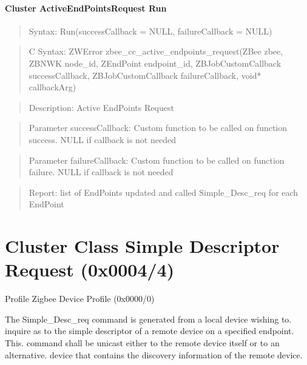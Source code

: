 \paragraph{Cluster ActiveEndPointsRequest Run}
\begin{quote}Syntax: Run(successCallback = NULL, failureCallback = NULL)\end{quote}
\begin{quote}C Syntax: ZWError zbee\_cc\_active\_endpoints\_request(ZBee zbee, ZBNWK node\_id, ZEndPoint endpoint\_id, ZBJobCustomCallback successCallback, ZBJobCustomCallback failureCallback, void* callbackArg)\end{quote}
\begin{quote}Description: Active EndPoints Request\end{quote}
\begin{quote}Parameter successCallback: Custom function to be called on function success. NULL if callback is not needed\end{quote}
\begin{quote}Parameter failureCallback: Custom function to be called on function failure. NULL if callback is not needed\end{quote}
\begin{quote}Report: list of EndPoints updated and called Simple\_Desc\_req for each EndPoint\end{quote}


\section{Cluster Class Simple Descriptor Request (0x0004/4)}

Profile Zigbee Device Profile (0x0000/0)

The Simple\_Desc\_req command is generated from a local device wishing to. inquire as to the simple descriptor of a remote device on a specified endpoint. This. command shall be unicast either to the remote device itself or to an alternative. device that contains the discovery information of the remote device.
